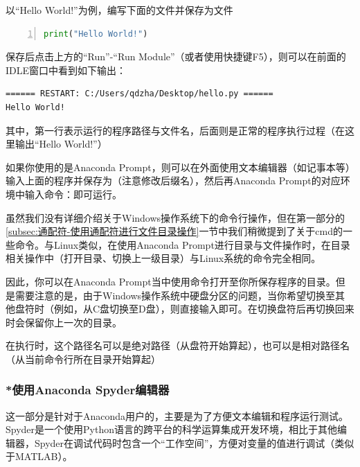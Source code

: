 以“Hello World!”为例，编写下面的文件并保存为文件

\begin{lstlisting}[language=python,numbers=left,caption={hello.py}]
print("Hello World!")
\end{lstlisting}

保存后点击上方的“Run”-“Run Module”（或者使用快捷键F5），则可以在前面的IDLE窗口中看到如下输出：


\begin{lstlisting}
====== RESTART: C:/Users/qdzha/Desktop/hello.py ======
Hello World!
\end{lstlisting}

其中，第一行表示运行的程序路径与文件名，后面则是正常的程序执行过程（在这里输出“Hello World!”）

如果你使用的是Anaconda Prompt，则可以在外面使用文本编辑器（如记事本等）输入上面的程序并保存为（注意修改后缀名），然后再Anaconda Prompt的对应环境中输入命令：即可运行。

\begin{extend}
    虽然我们没有详细介绍关于Windows操作系统下的命令行操作，但在第一部分的\ref{subsec:通配符-使用通配符进行文件目录操作}一节中我们稍微提到了关于cmd的一些命令。与Linux类似，在使用Anaconda Prompt进行目录与文件操作时，在目录相关操作中（打开目录、切换上一级目录）与Linux系统的命令完全相同。

    因此，你可以在Anaconda Prompt当中使用命令打开至你所保存程序的目录。但是需要注意的是，由于Windows操作系统中硬盘分区的问题，当你希望切换至其他盘符时（例如，从C盘切换至D盘），则直接输入即可。在切换盘符后再切换回来时会保留你上一次的目录。

    在执行时，这个路径名可以是绝对路径（从盘符开始算起），也可以是相对路径名（从当前命令行所在目录开始算起）
\end{extend}

\subsubsection{*使用Anaconda Spyder编辑器}

这一部分是针对于Anaconda用户的，主要是为了方便文本编辑和程序运行测试。Spyder是一个使用Python语言的跨平台的科学运算集成开发环境，相比于其他编辑器，Spyder在调试代码时包含一个“工作空间”，方便对变量的值进行调试（类似于MATLAB）。

